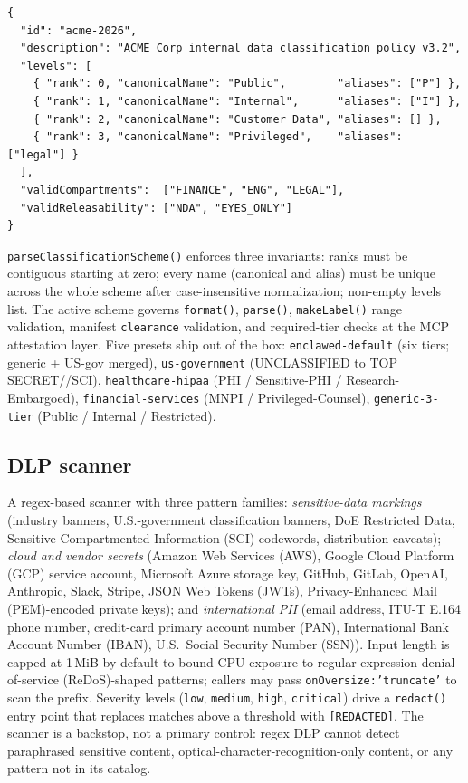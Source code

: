 \documentclass[11pt]{article}
\begin{document}
\begin{verbatim}
{
  "id": "acme-2026",
  "description": "ACME Corp internal data classification policy v3.2",
  "levels": [
    { "rank": 0, "canonicalName": "Public",        "aliases": ["P"] },
    { "rank": 1, "canonicalName": "Internal",      "aliases": ["I"] },
    { "rank": 2, "canonicalName": "Customer Data", "aliases": [] },
    { "rank": 3, "canonicalName": "Privileged",    "aliases": ["legal"] }
  ],
  "validCompartments":  ["FINANCE", "ENG", "LEGAL"],
  "validReleasability": ["NDA", "EYES_ONLY"]
}
\end{verbatim}

\texttt{parseClassificationScheme()} enforces three invariants: ranks
must be contiguous starting at zero; every name (canonical and alias)
must be unique across the whole scheme after case-insensitive
normalization; non-empty levels list. The active scheme governs
\texttt{format()}, \texttt{parse()}, \texttt{makeLabel()} range
validation, manifest \texttt{clearance} validation, and required-tier
checks at the MCP attestation layer. Five presets ship out of the box:
\texttt{enclawed-default} (six tiers; generic + US-gov merged),
\texttt{us-government} (UNCLASSIFIED to TOP SECRET//SCI),
\texttt{healthcare-hipaa} (PHI / Sensitive-PHI / Research-Embargoed),
\texttt{financial-services} (MNPI / Privileged-Counsel),
\texttt{generic-3-tier} (Public / Internal / Restricted).

\subsection{DLP scanner}

A regex-based scanner with three pattern families:
\emph{sensitive-data markings} (industry banners, U.S.-government
classification banners, DoE Restricted Data, Sensitive Compartmented
Information (SCI) codewords, distribution caveats); \emph{cloud and
vendor secrets} (Amazon Web Services (AWS), Google Cloud Platform (GCP)
service account, Microsoft Azure storage key, GitHub, GitLab, OpenAI,
Anthropic, Slack, Stripe, JSON Web Tokens (JWTs), Privacy-Enhanced
Mail (PEM)-encoded private keys); and \emph{international PII} (email
address, ITU-T E.164 phone number, credit-card primary account number
(PAN), International Bank Account Number (IBAN), U.S.\ Social Security
Number (SSN)). Input length is capped at 1\,MiB by default to bound
CPU exposure to regular-expression denial-of-service (ReDoS)-shaped
patterns; callers may pass \texttt{onOversize:'truncate'} to scan the
prefix. Severity levels (\texttt{low}, \texttt{medium}, \texttt{high},
\texttt{critical}) drive a \texttt{redact()} entry point that replaces
matches above a threshold with \texttt{[REDACTED]}. The scanner is a
backstop, not a primary control: regex DLP cannot detect paraphrased
sensitive content, optical-character-recognition-only content, or any
pattern not in its catalog.
\end{document}
